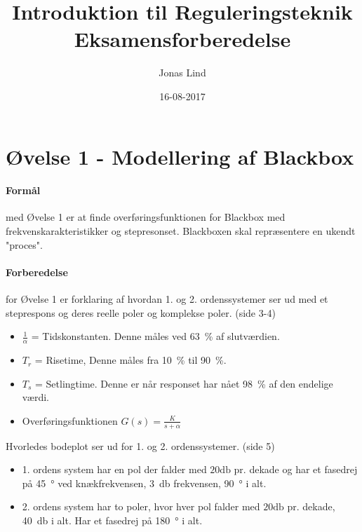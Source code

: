 \documentclass[danish]{article}
\begin{document}
\title{\textbf{ Introduktion til Reguleringsteknik }    Eksamensforberedelse}
\author{Jonas Lind}
\date{16-08-2017}
\maketitle
\tableofcontents
\newpage
\section{Øvelse 1 - Modellering af Blackbox}

\paragraph{Formål} med Øvelse 1 er at finde overføringsfunktionen for Blackbox med frekvenskarakteristikker og stepresonset.  Blackboxen skal repræsentere en ukendt "proces".
 
\paragraph{Forberedelse} for Øvelse 1 er forklaring af hvordan 1. og 2. ordenssystemer ser ud med et steprespons og deres reelle poler og komplekse poler. (side 3-4)
\begin{itemize}
	\item $\frac{1}{\alpha}$ = Tidskonstanten. Denne måles ved \SI{63}{\percent} af slutværdien.
	\item $T_r$ = Risetime, Denne måles fra \SI{10}{\percent} til \SI{90}{\percent}.
	\item $T_s$ = Setlingtime. Denne er når responset har nået \SI{98}{\percent} af den endelige værdi.
	\item Overføringsfunktionen $G(s)= \frac{K}{s+\alpha}$
\end{itemize}

Hvorledes bodeplot ser ud for 1. og 2. ordenssystemer. (side 5)
\begin{itemize}
	\item 1. ordens system har en pol der falder med $20 \si{\decibel}$ pr. dekade og har et fasedrej på \SI{45}{\degree} ved knækfrekvensen, \SI{3}{\decibel} frekvensen, \SI{90}{\degree} i alt. 
	\item 2. ordens system har to poler, hvor hver pol falder med $20 \si{\decibel}$ pr. dekade, \SI{40}{\decibel} i alt. Har et fasedrej på \SI{180}{\degree} i alt. 
\end{itemize}
\end{document}
